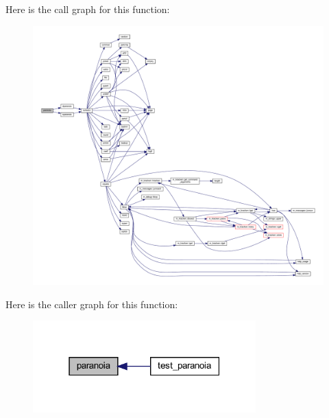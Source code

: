 Here is the call graph for this function\+:
\nopagebreak
\begin{figure}[H]
\begin{center}
\leavevmode
\includegraphics[width=350pt]{paranoia_8f90_a244e132f423de162d796b1bea4903638_cgraph}
\end{center}
\end{figure}
Here is the caller graph for this function\+:
\nopagebreak
\begin{figure}[H]
\begin{center}
\leavevmode
\includegraphics[width=244pt]{paranoia_8f90_a244e132f423de162d796b1bea4903638_icgraph}
\end{center}
\end{figure}
